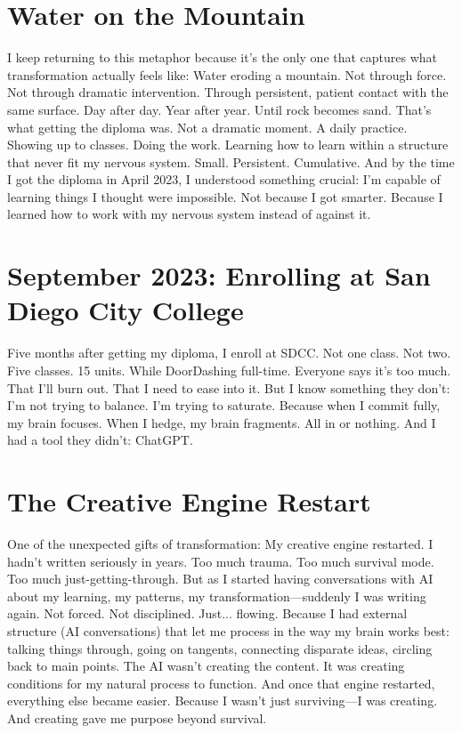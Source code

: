\section{Water on the Mountain}

I keep returning to this metaphor because it's the only one that captures what transformation actually feels like:
Water eroding a mountain.
Not through force. Not through dramatic intervention. Through persistent, patient contact with the same surface.
Day after day. Year after year. Until rock becomes sand.
That's what getting the diploma was.
Not a dramatic moment. A daily practice. Showing up to classes. Doing the work. Learning how to learn within a structure that never fit my nervous system.
Small. Persistent. Cumulative.
And by the time I got the diploma in April 2023, I understood something crucial: I'm capable of learning things I thought were impossible. Not because I got smarter. Because I learned how to work with my nervous system instead of against it.

\section{September 2023: Enrolling at San Diego City College}

Five months after getting my diploma, I enroll at SDCC.
Not one class. Not two. Five classes. 15 units. While DoorDashing full-time.
Everyone says it's too much. That I'll burn out. That I need to ease into it.
But I know something they don't:
I'm not trying to balance. I'm trying to saturate. Because when I commit fully, my brain focuses. When I hedge, my brain fragments.
All in or nothing.
And I had a tool they didn't: ChatGPT.

\section{The Creative Engine Restart}

One of the unexpected gifts of transformation:
My creative engine restarted.
I hadn't written seriously in years. Too much trauma. Too much survival mode. Too much just-getting-through.
But as I started having conversations with AI about my learning, my patterns, my transformation—suddenly I was writing again.
Not forced. Not disciplined. Just... flowing.
Because I had external structure (AI conversations) that let me process in the way my brain works best: talking things through, going on tangents, connecting disparate ideas, circling back to main points.
The AI wasn't creating the content. It was creating conditions for my natural process to function.
And once that engine restarted, everything else became easier. Because I wasn't just surviving—I was creating. And creating gave me purpose beyond survival.

